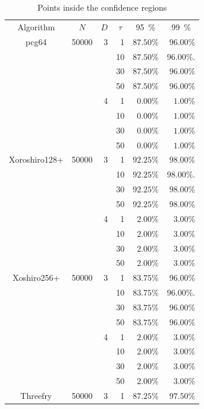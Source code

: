 \documentclass[12pt]{article}
\begin{document}
\begin{description}
\begin{table}[!h]
\centering
\caption{Points inside the confidence regions}
\label{tab:result1}
\begin{tabular}{c*{5}r}
	\toprule
	Algorithm & \multicolumn{1}{c}{$N$} & \multicolumn{1}{c}{$D$} & \multicolumn{1}{c}{$\tau$} & \multicolumn{1}{c}{\SI{95}{\percent}} & \multicolumn{1}{c}{\SI{99}{\percent}}\\
	\cmidrule(lr){1-1}
	\cmidrule(lr){2-2}
	\cmidrule(lr){3-3}
	\cmidrule(lr){4-4}
	\cmidrule(lr){5-5}
	\cmidrule(lr){6-6}
	pcg64 & 50000 & 3 & 1 & $87.50 \%$ & $96.00\%$\\
	&  & & 10 & $87.50\%$ & $96.00\%.$\\
	&  & & 30 & $87.50\%$ & $96.00\%$\\
	&  & & 50 & $87.50\%$ & $96.00\%$\\ 
	\cmidrule(lr){3-6}
	&  & 4 & 1 & $0.00\%$ & $1.00\%$\\
	&  &   & 10& $0.00\%$ & $1.00\%$\\
	&  &  & 30 & $0.00\%$ & $1.00\%$\\
	&  &  & 50 & $0.00\%$ & $1.00\%$\\
	\cmidrule(lr){1-6}
	Xoroshiro128+ & 50000 & 3 & 1 & $92.25 \%$ & $98.00\%$\\
	&  & & 10 & $92.25\%$ & $98.00\%.$\\
	&  & & 30 & $92.25\%$ & $98.00\%$\\
	&  & & 50 & $92.25\%$ & $98.00\%$\\ 
	\cmidrule(lr){3-6}
	&  & 4 & 1 & $2.00\%$ & $3.00\%$\\
	&  &   & 10& $2.00\%$ & $3.00\%$\\
	&  &  & 30 & $2.00\%$ & $3.00\%$\\
	&  &  & 50 & $2.00\%$ & $3.00\%$\\
	\cmidrule(lr){1-6}
	Xoshiro256+ & 50000 & 3 & 1 & $83.75 \%$ & $96.00\%$\\
	&  & & 10 & $83.75\%$ & $96.00\%.$\\
	&  & & 30 & $83.75\%$ & $96.00\%$\\
	&  & & 50 & $83.75\%$ & $96.00\%$\\ 
	\cmidrule(lr){3-6}
	&  & 4 & 1 & $2.00\%$ & $3.00\%$\\
	&  &   & 10& $2.00\%$ & $3.00\%$\\
	&  &  & 30 & $2.00\%$ & $3.00\%$\\
	&  &  & 50 & $2.00\%$ & $3.00\%$\\
	\cmidrule(lr){1-6}
	Threefry & 50000 & 3 & 1 & $87.25 \%$ & $97.50\%$\\

\end{tabular}
\end{table}
\end{description}
\end{document}
